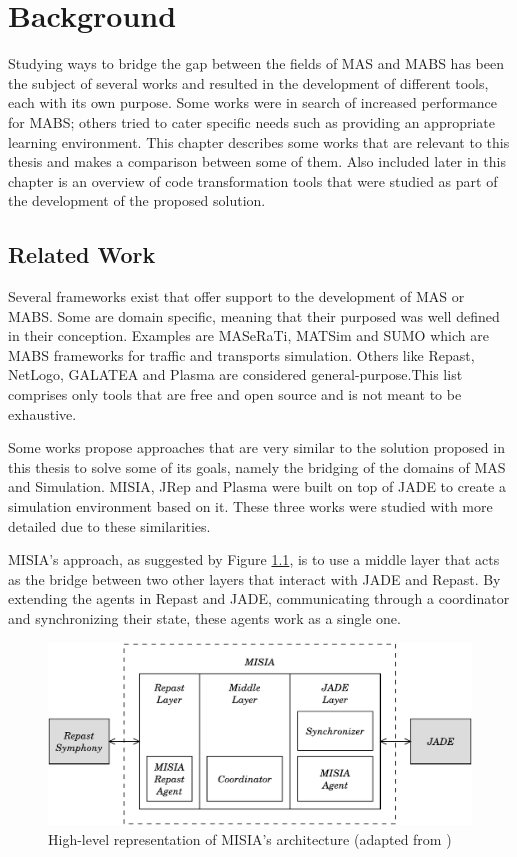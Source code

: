 \chapter{Background}
\label{chap:background}


Studying ways to bridge the gap between the fields of \gls{MAS} and \gls{MABS} has been the subject of several works and resulted in the development of different tools, each with its own purpose. Some works were in search of increased performance for MABS; others tried to cater specific needs such as providing an appropriate learning environment. This chapter describes some works that are relevant to this thesis and makes a comparison between some of them. Also included later in this chapter is an overview of code transformation tools that were studied as part of the development of the proposed solution.

\section{Related Work}
Several frameworks exist that offer support to the development of MAS or MABS. Some are domain specific, meaning that their purposed was well defined in their conception. Examples are MASeRaTi\cite{ahlbrecht2014scalable}, MATSim\cite{balmer2008agent} and SUMO\cite{SUMO2012} which are MABS frameworks for traffic and transports simulation. Others like Repast\cite{collier2003repast}, NetLogo\cite{tisue2004netlogo}, GALATEA\cite{davila2000galatea} and Plasma\cite{warden2010towards} are considered general-purpose.This list comprises only tools that are free and open source and is not meant to be exhaustive.

Some works propose approaches that are very similar to the solution proposed in this thesis to solve some of its goals, namely the bridging of the domains of MAS and Simulation. MISIA, JRep and Plasma were built on top of JADE to create a simulation environment based on it. These three works were studied with more detailed due to these similarities.

MISIA's approach, as suggested by Figure \ref{fig:misia}, is to use a middle layer that acts as the bridge between two other layers that interact with JADE and Repast. By extending the agents in Repast and JADE, communicating through a coordinator and synchronizing their state, these agents work as a single one.

\begin{figure}[h]
	\centering
	\includegraphics[width=0.75\linewidth]{figures/MISIA.pdf}
	\caption{High-level representation of MISIA's architecture (adapted from \cite{garcia2011misia})}
	\label{fig:misia}
\end{figure}

